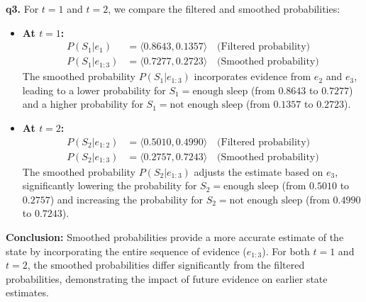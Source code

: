 \documentclass[cn,12pt]{homework}
\begin{document}
\begin{solution}
\textbf{q3.}
For $t = 1$ and $t = 2$, we compare the filtered and smoothed probabilities:

\begin{itemize}
    \item \textbf{At $t = 1$:}
    \begin{align*}
        P(S_1 | e_1) & = \langle 0.8643, 0.1357 \rangle \quad \text{(Filtered probability)} \\
        P(S_1 | e_{1:3}) & = \langle 0.7277, 0.2723 \rangle \quad \text{(Smoothed probability)}
    \end{align*}
    The smoothed probability $P(S_1 | e_{1:3})$ incorporates evidence from $e_2$ and $e_3$, leading to a lower probability for $S_1 = \text{enough sleep}$ (from $0.8643$ to $0.7277$) and a higher probability for $S_1 = \text{not enough sleep}$ (from $0.1357$ to $0.2723$).

    \item \textbf{At $t = 2$:}
    \begin{align*}
        P(S_2 | e_{1:2}) & = \langle 0.5010, 0.4990 \rangle \quad \text{(Filtered probability)} \\
        P(S_2 | e_{1:3}) & = \langle 0.2757, 0.7243 \rangle \quad \text{(Smoothed probability)}
    \end{align*}
    The smoothed probability $P(S_2 | e_{1:3})$ adjusts the estimate based on $e_3$, significantly lowering the probability for $S_2 = \text{enough sleep}$ (from $0.5010$ to $0.2757$) and increasing the probability for $S_2 = \text{not enough sleep}$ (from $0.4990$ to $0.7243$).
\end{itemize}

\textbf{Conclusion:}  
Smoothed probabilities provide a more accurate estimate of the state by incorporating the entire sequence of evidence ($e_{1:3}$). For both $t = 1$ and $t = 2$, the smoothed probabilities differ significantly from the filtered probabilities, demonstrating the impact of future evidence on earlier state estimates.
\end{solution}


\newpage








\end{document}
